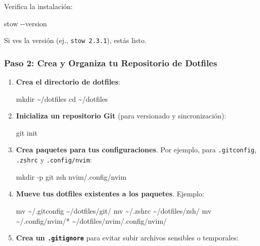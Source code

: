 \documentclass[
  jou,
  floatsintext,
  longtable,
  a4paper,
  nolmodern,
  notxfonts,
  notimes,
  colorlinks=true,linkcolor=blue,citecolor=blue,urlcolor=blue]{apa7}
\newenvironment{Shaded}{\begin{snugshade}}{\end{snugshade}}
\newcommand{\AttributeTok}[1]{\textcolor[rgb]{0.40,0.45,0.13}{#1}}
\newcommand{\BuiltInTok}[1]{\textcolor[rgb]{0.00,0.23,0.31}{#1}}
\newcommand{\ExtensionTok}[1]{\textcolor[rgb]{0.00,0.23,0.31}{#1}}
\newcommand{\FunctionTok}[1]{\textcolor[rgb]{0.28,0.35,0.67}{#1}}
\newcommand{\NormalTok}[1]{\textcolor[rgb]{0.00,0.23,0.31}{#1}}
\newcommand{\PreprocessorTok}[1]{\textcolor[rgb]{0.68,0.00,0.00}{#1}}
\begin{document}
Verifica la instalación:

\begin{Shaded}
\begin{Highlighting}[]
\ExtensionTok{stow} \AttributeTok{{-}{-}version}
\end{Highlighting}
\end{Shaded}

Si ves la versión (ej., \texttt{stow\ 2.3.1}), estás listo.

\subsubsection{Paso 2: Crea y Organiza tu Repositorio de
Dotfiles}\label{paso-2-crea-y-organiza-tu-repositorio-de-dotfiles}

\begin{enumerate}
\def\labelenumi{\arabic{enumi}.}
\item
  \textbf{Crea el directorio de dotfiles}:

\begin{Shaded}
\begin{Highlighting}[]
\FunctionTok{mkdir}\NormalTok{ \textasciitilde{}/dotfiles}
\BuiltInTok{cd}\NormalTok{ \textasciitilde{}/dotfiles}
\end{Highlighting}
\end{Shaded}
\item
  \textbf{Inicializa un repositorio Git} (para versionado y
  sincronización):

\begin{Shaded}
\begin{Highlighting}[]
\FunctionTok{git}\NormalTok{ init}
\end{Highlighting}
\end{Shaded}
\item
  \textbf{Crea paquetes para tus configuraciones}. Por ejemplo, para
  \texttt{.gitconfig}, \texttt{.zshrc} y \texttt{.config/nvim}:

\begin{Shaded}
\begin{Highlighting}[]
\FunctionTok{mkdir} \AttributeTok{{-}p}\NormalTok{ git zsh nvim/.config/nvim}
\end{Highlighting}
\end{Shaded}
\item
  \textbf{Mueve tus dotfiles existentes a los paquetes}. Ejemplo:

\begin{Shaded}
\begin{Highlighting}[]
\FunctionTok{mv}\NormalTok{ \textasciitilde{}/.gitconfig \textasciitilde{}/dotfiles/git/}
\FunctionTok{mv}\NormalTok{ \textasciitilde{}/.zshrc \textasciitilde{}/dotfiles/zsh/}
\FunctionTok{mv}\NormalTok{ \textasciitilde{}/.config/nvim/}\PreprocessorTok{*}\NormalTok{ \textasciitilde{}/dotfiles/nvim/.config/nvim/}
\end{Highlighting}
\end{Shaded}
\item
  \textbf{Crea un \texttt{.gitignore}} para evitar subir archivos
  sensibles o temporales:


\end{enumerate}
\end{document}
